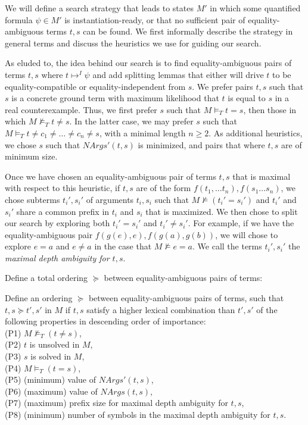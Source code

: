 \documentclass{llncs}
\begin{document}
We will define a search strategy that leads to states $M'$ in which some quantified formula $\psi \in M'$ is instantiation-ready, or that no sufficient pair of equality-ambiguous terms $t, s$ can be found.
We first informally describe the strategy in general terms and discuss the heuristics we use for guiding our search.

As eluded to, the idea behind our search is to find equality-ambiguous pairs of terms $t, s$ where $t \mapsto^I \psi$ and add splitting lemmas that either will drive $t$ to be equality-compatible or equality-independent from $s$.
We prefer pairs $t, s$ such that $s$ is a concrete ground term with maximum likelihood that $t$ is equal to $s$ in a real counterexample.
Thus, we first prefer $s$ such that $M \models_T t = s$, then those in which $M \not\models_T t \neq s$.
In the latter case, we may prefer $s$ such that $M \models_T t \neq c_1 \neq \ldots \neq c_n \neq s$, with a minimal length $n \geq 2$.
As additional heuristics, we chose $s$ such that $NArgs'( t, s )$ is minimized, and pairs that where $t, s$ are of minimum size.

Once we have chosen an equality-ambiguous pair of terms $t,s$ that is maximal with respect to this heuristic, if $t, s$ are of the form $f( t_1, \ldots t_n ), f( s_1 \ldots s_n)$, we chose subterms $t_i', s_i'$ of arguments $t_i, s_i$ such that $M \not\models ( t_i' = s_i' )$ and $t_i'$ and $s_i'$ share a common prefix in $t_i$ and $s_i$ that is maximized.
We then chose to split our search by exploring both $t_i' = s_i'$ and $t_i' \neq s_i'$.
For example, if we have the equality-ambiguous pair $f( g( e ), e ), f( g( a ), g( b ) )$, we will chose to explore $e = a$ and $e \neq a$ in the case that $M \not\models e = a$.
We call the terms $t_i', s_i'$ the \emph{maximal depth ambiguity for $t, s$}.

Define a total ordering $\succeq$ between equality-ambiguous pairs of terms:

\begin{definition}
Define an ordering $\succeq$ between equality-ambiguous pairs of terms, such that $t,s \succeq t',s'$ in $M$ if $t,s$ satisfy a higher lexical combination than $t',s'$ of the following properties in descending order of importance:  \\
(P1) $M \not\models_T (t \neq s)$, \\
(P2) $t$ is unsolved in $M$, \\
(P3) $s$ is solved in $M$, \\
(P4) $M \models_T (t = s)$, \\
(P5) (minimum) value of $NArgs'( t, s )$, \\
(P6) (maximum) value of $NArgs( t, s )$, \\
(P7) (maximum) prefix size for maximal depth ambiguity for $t,s$, \\
(P8) (minimum) number of symbols in the maximal depth ambiguity for $t,s$.
\end{definition}
\end{document}

